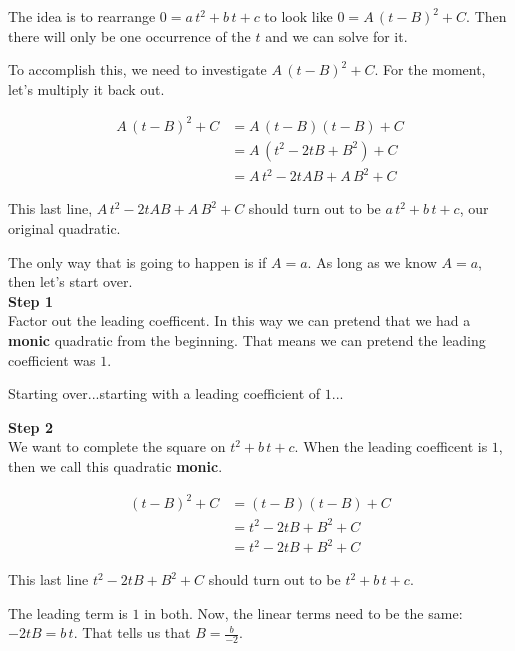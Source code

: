 \documentclass{ximera}
\begin{document}
The idea is to rearrange  $0 = a \, t^2 + b \, t + c$ to look like $0 = A \, (t-B)^2 + C$.  Then there will only be  one occurrence of the $t$ and we can solve for it.


To accomplish this, we need to investigate $A \, (t-B)^2 + C$. For the moment, let's multiply it back out.


\begin{align*}
A \, (t-B)^2 + C & = A \, (t-B)(t-B) + C \\
& = A \, (t^2 - 2 t B + B^2) + C  \\
& = A \, t^2 - 2 t A B + A \, B^2 + C
\end{align*}

This last line, $A \, t^2 - 2 t A B + A \, B^2 + C$ should turn out to be $a \, t^2 + b \, t + c$, our original quadratic.

The only way that is going to happen is if $A = a$. As long as we know $A = a$, then let's start over. \\






\textbf{\textcolor{blue!75!black}{Step 1}} \\

 Factor out the leading coefficent.   In this way we can pretend that we had a \textbf{monic} quadratic from the beginning.  That means we can pretend the leading coefficient was $1$.


Starting over...starting with a leading coefficient of $1$...


\textbf{\textcolor{blue!75!black}{Step 2}} \\


We want to complete the square on $t^2 + b \, t + c$.  When the leading coefficent is $1$, then we call this quadratic \textbf{monic}.



\begin{align*}
(t-B)^2 + C & = (t-B)(t-B) + C \\
& = t^2 - 2 t B + B^2 + C  \\
& = t^2 - 2 t B +  B^2 + C
\end{align*}


This last line $t^2 - 2 t B + B^2 + C$ should turn out to be $t^2 + b \, t + c$.



The leading term is $1$ in both. Now, the linear terms need to be the same: $ - 2 t B = b \, t$.  That tells us that $B = \frac{b}{-2}$.
\end{document}
